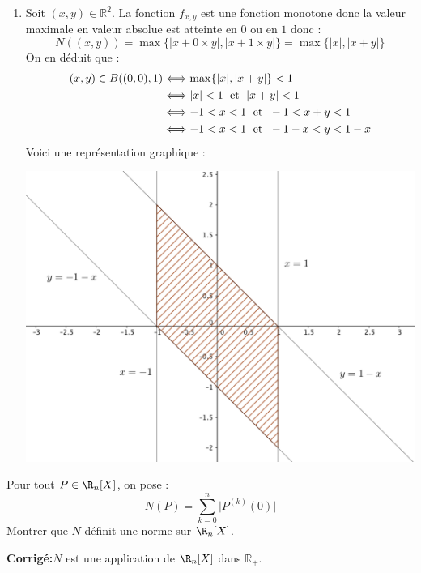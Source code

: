 \documentclass[a4paper,twoside,french,11pt]{VcCours}
\newcommand{\corr}{\textbf{Corrigé:}}
\begin{document}
\begin{enumerate}
\item Soit $(x,y) \in \mathbb{R}^2$. La fonction $f_{x,y}$ est une fonction monotone donc la valeur maximale en valeur absolue est atteinte en $0$ ou en $1$ donc :
$$ N((x,y)) = \max \lbrace \vert x+ 0 \times y \vert, \vert x+ 1 \times y \vert \rbrace = \max \lbrace \vert x \vert, \vert x+y \vert \rbrace$$
On en déduit que :
\begin{align*}
(x,y) \in B((0,0),1) & \Longleftrightarrow \max \lbrace \vert x \vert, \vert x+y \vert \rbrace <1 \\
& \Longleftrightarrow \vert x \vert < 1 \; \hbox{ et } \; \vert x+y \vert < 1 \\
& \Longleftrightarrow -1 <x<1 \; \hbox{ et } \;  -1 < x+y<1 \\
& \Longleftrightarrow - 1<x<1 \; \hbox{ et } \; -1-x <y <1-x
\end{align*}
Voici une représentation graphique :


\begin{center}
\includegraphics[scale=0.4]{BouleU}
\end{center}
\end{enumerate}

\begin{Exercice}{} Pour tout $P  \in \R_n[X ]$, on pose :
$$N(P) = \sum_{k = 0}^{ n } \vert P^{(k)} (0) \vert $$
Montrer que $N$ définit une norme sur $\R_n [X]$.
\end{Exercice}

\corr $N$ est une application de $\R_n[X ]$ dans $\mathbb{R}_+$.
\end{document}
